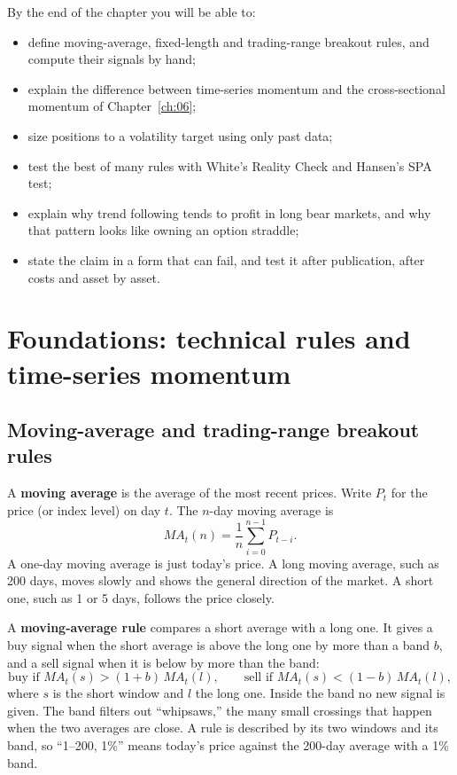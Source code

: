 By the end of the chapter you will be able to:

\begin{itemize}
  \item define moving-average, fixed-length and trading-range breakout rules, and compute their signals by hand;
  \item explain the difference between time-series momentum and the cross-sectional momentum of Chapter~\ref{ch:06};
  \item size positions to a volatility target using only past data;
  \item test the best of many rules with White's Reality Check and Hansen's SPA test;
  \item explain why trend following tends to profit in long bear markets, and why that pattern looks like owning an option straddle;
  \item state the claim in a form that can fail, and test it after publication, after costs and asset by asset.
\end{itemize}

\section{Foundations: technical rules and time-series momentum}
\label{sec:09-foundations}

\subsection{Moving-average and trading-range breakout rules}

A \textbf{moving average} is the average of the most recent prices. Write $P_t$ for the price (or index level) on day $t$. The $n$-day moving average is
\begin{equation}
  MA_t(n) = \frac{1}{n} \sum_{i=0}^{n-1} P_{t-i}.
  \label{eq:09-ma}
\end{equation}
A one-day moving average is just today's price. A long moving average, such as 200 days, moves slowly and shows the general direction of the market. A short one, such as 1 or 5 days, follows the price closely.

A \textbf{moving-average rule} compares a short average with a long one. It gives a buy signal when the short average is above the long one by more than a band $b$, and a sell signal when it is below by more than the band:
\begin{equation}
  \text{buy if } MA_t(s) > (1+b)\,MA_t(l), \qquad \text{sell if } MA_t(s) < (1-b)\,MA_t(l),
  \label{eq:09-marule}
\end{equation}
where $s$ is the short window and $l$ the long one. Inside the band no new signal is given. The band filters out ``whipsaws,'' the many small crossings that happen when the two averages are close. A rule is described by its two windows and its band, so ``1--200, 1\%'' means today's price against the 200-day average with a 1\% band.

